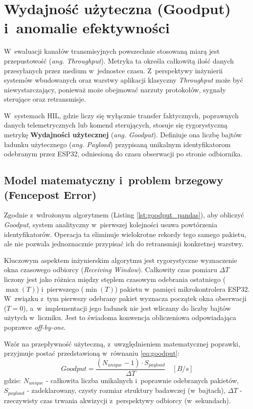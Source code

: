 \section{Wydajność użyteczna (Goodput) i~anomalie efektywności}
\label{sec:goodput}

W~ewaluacji kanałów transmisyjnych powszechnie stosowaną miarą jest przepustowość (\textit{ang. Throughput}).
Metryka ta określa całkowitą ilość danych przesyłanych przez medium w~jednostce czasu.
Z~perspektywy inżynierii systemów wbudowanych oraz warstwy aplikacji klasyczny \textit{Throughput} może być niewystarczający, ponieważ może obejmować narzuty protokołów, sygnały sterujące oraz retransmisje.

W~systemach HIL, gdzie liczy się wyłącznie transfer faktycznych, poprawnych danych telemetrycznych lub komend sterujących, stosuje się rygorystyczną metrykę \textbf{Wydajności użytecznej} (\textit{ang. Goodput}).
Definiuje ona liczbę bajtów ładunku użytecznego (\textit{ang. Payload}) przypisaną unikalnym identyfikatorom odebranym przez ESP32, odniesioną do czasu obserwacji po stronie odbiornika.

\subsection{Model matematyczny i~problem brzegowy (Fencepost Error)}

Zgodnie z~wdrożonym algorytmem (Listing \ref{lst:goodput_pandas}), aby obliczyć \textit{Goodput}, system analityczny w~pierwszej kolejności usuwa powtórzenia identyfikatorów.
Operacja ta eliminuje wielokrotne rekordy tego samego pakietu, ale nie pozwala jednoznacznie przypisać ich do retransmisji konkretnej warstwy.

Kluczowym aspektem inżynierskim algorytmu jest rygorystyczne wyznaczenie okna czasowego odbiorcy (\textit{Receiving Window}).
Całkowity czas pomiaru $\Delta T$ liczony jest jako różnica między stęplem czasowym odebrania ostatniego ($\max(T)$) i~pierwszego ($\min(T)$) pakietu w~pamięci mikrokontrolera ESP32.
W~związku z~tym pierwszy odebrany pakiet wyznacza początek okna obserwacji ($T=0$), a~w~implementacji jego ładunek nie jest wliczany do liczby bajtów użytych w~liczniku.
Jest to świadoma konwencja obliczeniowa odpowiadająca poprawce \textit{off-by-one}.

Wzór na przepływność użyteczną, z~uwzględnieniem matematycznej poprawki, przyjmuje postać przedstawioną w~równaniu \ref{eq:goodput}:
\begin{equation}
    Goodput = \frac{(N_{unique} - 1) \cdot S_{payload}}{\Delta T} \quad [B/s] \label{eq:goodput} \end{equation} gdzie: $N_{unique}$ - całkowita liczba unikalnych i~poprawnie odebranych pakietów, $S_{payload}$ - zadeklarowany, czysty rozmiar struktury badawczej (w~bajtach), $\Delta T$ - rzeczywisty czas trwania akwizycji z~perspektywy odbiorcy (w~sekundach).


